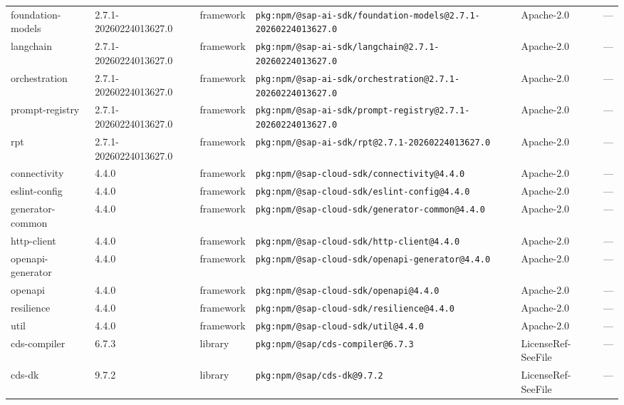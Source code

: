 \documentclass[11pt,a4paper]{article}
\begin{document}
\begin{longtable}{|p{4cm}|p{2cm}|p{1.6cm}|p{5cm}|p{1.5cm}|p{3.5cm}|}
\raggedright foundation-models & 2.7.1-20260224013627.0 & framework & \small\texttt{pkg:npm/@sap-ai-sdk/foundation-models@2.7.1-20260224013627.0} & Apache-2.0 & \small — \\
\raggedright langchain & 2.7.1-20260224013627.0 & framework & \small\texttt{pkg:npm/@sap-ai-sdk/langchain@2.7.1-20260224013627.0} & Apache-2.0 & \small — \\
\raggedright orchestration & 2.7.1-20260224013627.0 & framework & \small\texttt{pkg:npm/@sap-ai-sdk/orchestration@2.7.1-20260224013627.0} & Apache-2.0 & \small — \\
\raggedright prompt-registry & 2.7.1-20260224013627.0 & framework & \small\texttt{pkg:npm/@sap-ai-sdk/prompt-registry@2.7.1-20260224013627.0} & Apache-2.0 & \small — \\
\raggedright rpt & 2.7.1-20260224013627.0 & framework & \small\texttt{pkg:npm/@sap-ai-sdk/rpt@2.7.1-20260224013627.0} & Apache-2.0 & \small — \\
\raggedright connectivity & 4.4.0 & framework & \small\texttt{pkg:npm/@sap-cloud-sdk/connectivity@4.4.0} & Apache-2.0 & \small — \\
\raggedright eslint-config & 4.4.0 & framework & \small\texttt{pkg:npm/@sap-cloud-sdk/eslint-config@4.4.0} & Apache-2.0 & \small — \\
\raggedright generator-common & 4.4.0 & framework & \small\texttt{pkg:npm/@sap-cloud-sdk/generator-common@4.4.0} & Apache-2.0 & \small — \\
\raggedright http-client & 4.4.0 & framework & \small\texttt{pkg:npm/@sap-cloud-sdk/http-client@4.4.0} & Apache-2.0 & \small — \\
\raggedright openapi-generator & 4.4.0 & framework & \small\texttt{pkg:npm/@sap-cloud-sdk/openapi-generator@4.4.0} & Apache-2.0 & \small — \\
\raggedright openapi & 4.4.0 & framework & \small\texttt{pkg:npm/@sap-cloud-sdk/openapi@4.4.0} & Apache-2.0 & \small — \\
\raggedright resilience & 4.4.0 & framework & \small\texttt{pkg:npm/@sap-cloud-sdk/resilience@4.4.0} & Apache-2.0 & \small — \\
\raggedright util & 4.4.0 & framework & \small\texttt{pkg:npm/@sap-cloud-sdk/util@4.4.0} & Apache-2.0 & \small — \\
\raggedright cds-compiler & 6.7.3 & library & \small\texttt{pkg:npm/@sap/cds-compiler@6.7.3} & LicenseRef-SeeFile & \small — \\
\raggedright cds-dk & 9.7.2 & library & \small\texttt{pkg:npm/@sap/cds-dk@9.7.2} & LicenseRef-SeeFile & \small — \\

\end{longtable}
\end{document}
